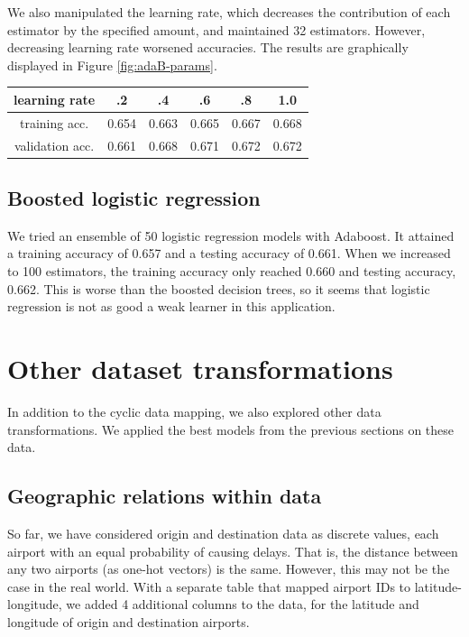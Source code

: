 \documentclass{article}
\begin{document}
\begin{multicols}{2}
We also manipulated the learning rate,
which decreases the contribution of each estimator
by the specified amount,
and maintained 32 estimators.
However, decreasing learning rate worsened accuracies.
The results are graphically displayed in Figure \ref{fig:adaB-params}.

\begin{center}
    \begin{tabular}{c|ccccc}
        learning rate &
          .2 & .4 & .6 & .8 & 1.0 \\\hline
        training acc. &
          0.654& 0.663& 0.665& 0.667& 0.668\\
        validation acc. &
          0.661& 0.668& 0.671& 0.672& 0.672
    \end{tabular}
\end{center}

\subsection{Boosted logistic regression}

We tried an ensemble of 50 
logistic regression models with Adaboost.
It attained a training accuracy of 0.657
and a testing accuracy of 0.661.
When we increased to 100 estimators,
the training accuracy only reached 0.660
and testing accuracy, 0.662.
This is worse than the boosted decision trees,
so it seems that
logistic regression is not as good a
weak learner in this application.
%
%

\section{Other dataset transformations}
\label{sec:dataset}

In addition to the cyclic data mapping,
we also explored other data transformations.
We applied the best models from the previous sections
on these data.

\subsection{Geographic relations within data}

So far, we have considered origin and destination data
as discrete values,
each airport with an equal probability of causing delays.
That is, the distance between any two airports
(as one-hot vectors) is the same.
However, this may not be the case in the real world.
With a separate table that mapped
airport IDs to latitude-longitude,
we added 4 additional columns to the data,
for the latitude and longitude of origin and destination airports.


\end{multicols}
\end{document}
